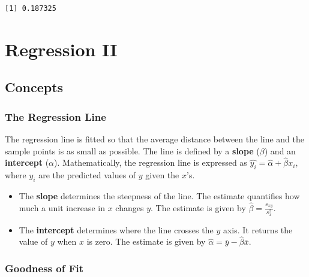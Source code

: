 \documentclass[
  letterpaper,
  DIV=11,
  numbers=noendperiod]{scrreprt}
\newenvironment{Shaded}{\begin{snugshade}}{\end{snugshade}}
\newcommand{\DecValTok}[1]{\textcolor[rgb]{0.68,0.00,0.00}{#1}}
\newcommand{\FunctionTok}[1]{\textcolor[rgb]{0.28,0.35,0.67}{#1}}
\newcommand{\NormalTok}[1]{\textcolor[rgb]{0.00,0.23,0.31}{#1}}
\newcommand{\SpecialCharTok}[1]{\textcolor[rgb]{0.37,0.37,0.37}{#1}}
\begin{document}
\begin{Shaded}
\end{Shaded}

\begin{verbatim}
[1] 0.187325
\end{verbatim}

\hypertarget{regression-ii}{%
\chapter{Regression II}\label{regression-ii}}

\hypertarget{concepts-6}{%
\section{Concepts}\label{concepts-6}}

\hypertarget{the-regression-line}{%
\subsection*{The Regression Line}\label{the-regression-line}}

The regression line is fitted so that the average distance between the
line and the sample points is as small as possible. The line is defined
by a \textbf{slope} (\(\beta\)) and an \textbf{intercept} (\(\alpha\)).
Mathematically, the regression line is expressed as
\(\hat{y_i}=\hat{\alpha}+\hat{\beta}x_i\), where \(\hat{y_i}\) are the
predicted values of \(y\) given the \(x\)'s.

\begin{itemize}
\item
  The \textbf{slope} determines the steepness of the line. The estimate
  quantifies how much a unit increase in \(x\) changes \(y\). The
  estimate is given by \(\hat{\beta}= \frac {s_{xy}}{s_{x}^2}\).
\item
  The \textbf{intercept} determines where the line crosses the \(y\)
  axis. It returns the value of \(y\) when \(x\) is zero. The estimate
  is given by \(\hat{\alpha}=\bar{y}-\hat{\beta}\bar{x}\).
\end{itemize}

\hypertarget{goodness-of-fit}{%
\subsection*{Goodness of Fit}\label{goodness-of-fit}}
\end{document}
